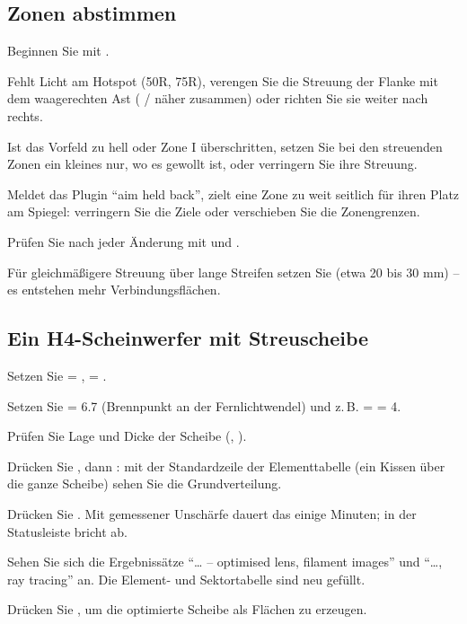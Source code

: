 \subsection{Zonen abstimmen}

\begin{schritte}
  \item Beginnen Sie mit .
  \item Fehlt Licht am Hotspot (50R, 75R), verengen Sie die Streuung der Flanke mit dem waagerechten
    Ast ( /  näher zusammen) oder richten Sie sie weiter
    nach rechts.
  \item Ist das Vorfeld zu hell oder Zone I überschritten, setzen Sie bei den streuenden Zonen ein
    kleines  nur, wo es gewollt ist, oder verringern Sie ihre Streuung.
  \item Meldet das Plugin \enquote{aim held back}, zielt eine Zone zu weit seitlich für ihren Platz
    am Spiegel: verringern Sie die Ziele oder verschieben Sie die Zonengrenzen.
  \item Prüfen Sie nach jeder Änderung mit  und .
  \item Für gleichmäßigere Streuung über lange Streifen setzen Sie  (etwa 20 bis
    30 mm) -- es entstehen mehr Verbindungsflächen.
\end{schritte}

\subsection{Ein H4-Scheinwerfer mit Streuscheibe}\label{sec:al-ablauf-h4}

\begin{schritte}
  \item Setzen Sie  = ,  =
    .
  \item Setzen Sie  = 6.7 (Brennpunkt an der
    Fernlichtwendel) und z.\,B.  =  = 4.
  \item Prüfen Sie Lage und Dicke der Scheibe (, ).
  \item Drücken Sie , dann : mit der Standardzeile
    der Elementtabelle (ein Kissen über die ganze Scheibe) sehen Sie die Grundverteilung.
  \item Drücken Sie . Mit gemessener Unschärfe dauert das einige Minuten;
     in der Statusleiste bricht ab.
  \item Sehen Sie sich die Ergebnissätze \enquote{… – optimised lens, filament images} und \enquote{…,
    ray tracing} an. Die Element- und Sektortabelle sind neu gefüllt.
  \item Drücken Sie , um die optimierte Scheibe als Flächen zu erzeugen.
\end{schritte}

